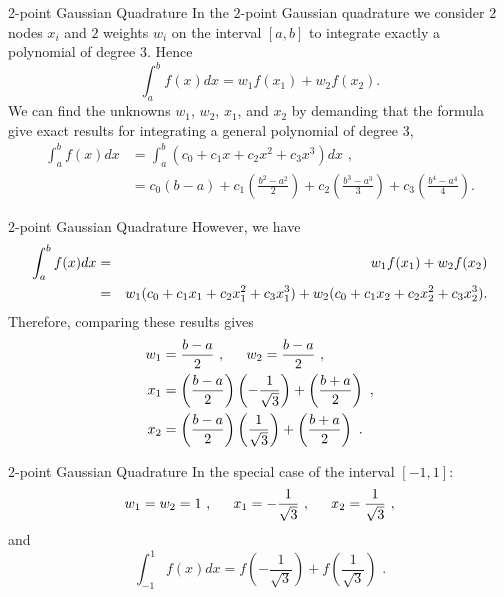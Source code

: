 \documentclass[11pt]{beamer}
\begin{document}
\begin{frame}[fragile]{2-point Gaussian Quadrature}
In the $2$-point Gaussian quadrature we consider $2$ nodes $x_i$ and $2$ weights $w_i$ on the interval $[a,b]$ to integrate exactly a polynomial of degree $3$. Hence
\begin{equation}
\int_a^b f(x) dx = w_1 f(x_1) + w_2 f(x_2).
\end{equation}
We can find the unknowns 
$w_1$, $w_2$, $x_1$, and $x_2$ by demanding that the
formula give exact results for integrating a general polynomial of
degree $3$,
\small
\begin{equation}
\begin{aligned}
\label{eq:gq1}
\int_a^b f(x) dx & = \int_a^b (c_0 + c_1 x + c_2 x^2 + c_3 x^3) dx\,\,,\\
& = c_0 (b-a) + c_1 \left(\frac{b^2 - a^2}{2} \right)
+ c_2 \left(\frac{b^3 - a^3}{3} \right) + c_3 \left(\frac{b^4 -a^4}{4} \right).
\end{aligned}
\end{equation}
\end{frame}

\begin{frame}[fragile]{2-point Gaussian Quadrature}
However, we have
\footnotesize
\begin{eqnarray}
\int_a^b f(x) dx &=& w_1 f(x_1) + w_2 f(x_2) \notag \\
&=& w_1(c_0 + c_1 x_1 + c_2 x_1^2 + c_3 x_1^3)
+ w_2 (c_0 + c_1 x_2 + c_2 x_2^2 + c_3 x_2^3).\notag
\end{eqnarray}
\normalsize
Therefore, comparing these results gives
\small
\begin{align}
w_1 &= \frac{b-a}{2}\,\,, \hspace*{1.5em} w_2 = \frac{b-a}{2}\,\,,\\
x_1 &= \left( \frac{b-a}{2}\right) \left(-\frac{1}{\sqrt{3}} \right) + 
\left(\frac{b+a}{2} \right)\,\,,\\
x_2 &= \left( \frac{b-a}{2}\right) \left(\frac{1}{\sqrt{3}} \right) + 
\left(\frac{b+a}{2} \right)\,\,.
\end{align}
\end{frame}

\begin{frame}[fragile]{2-point Gaussian Quadrature}
In the special case of the interval $[-1,1]$:
\begin{equation}
w_1 = w_2 = 1\,\,,\hspace{1.5em} x_1 = -\frac{1}{\sqrt{3}}\,\,,\hspace{1.5em}
x_2 = \frac{1}{\sqrt{3}}\,\,,
\end{equation}
and
\begin{equation}
\int_{-1}^1 f(x) dx = f\left(-\frac{1}{\sqrt{3}}\right) + f\left(\frac{1}{\sqrt{3}}\right)\,\,. 
\end{equation}
\end{frame}
\end{document}
